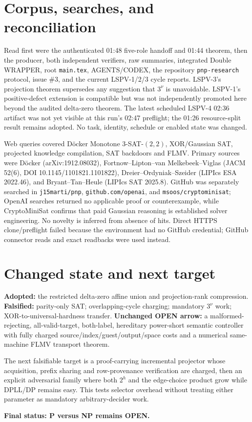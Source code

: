 \documentclass[11pt]{article}
\begin{document}
\section{Corpus, searches, and reconciliation}
Read first were the authenticated 01:48 five-role handoff and 01:44 theorem,
then the producer, both independent verifiers, raw summaries, integrated
Double WRAPPER, root \texttt{main.tex}, AGENTS/CODEX, the repository
\texttt{pnp-research} protocol, issue \#3, and the current LSPV-1/2/3 cycle
reports.  LSPV-3's projection theorem supersedes any suggestion that
$3^\nu$ is unavoidable.  LSPV-1's positive-defect extension is compatible but
was not independently promoted here beyond the audited delta-zero theorem.
The latest scheduled LSPV-4 02:36 artifact was not yet visible at this run's
02:47 preflight; the 01:26 resource-split result remains adopted.  No task,
identity, schedule or enabled state was changed.

Web queries covered D\"ocker Monotone 3-SAT-$(2,2)$, XOR/Gaussian SAT,
projected knowledge compilation, SAT backdoors and FLMV.  Primary sources
were D\"ocker (arXiv:1912.08032), Fortnow--Lipton--van Melkebeek--Viglas
(JACM 52(6), DOI 10.1145/1101821.1101822), Dreier--Ordyniak--Szeider
(LIPIcs ESA 2022.46), and Bryant--Tan--Heule (LIPIcs SAT 2025.8).
GitHub was separately searched in \texttt{j15marti/pnp},
\texttt{github.com/openai}, and \texttt{msoos/cryptominisat}; OpenAI searches
returned no applicable proof or counterexample, while CryptoMiniSat confirms
that paid Gaussian reasoning is established solver engineering.  No novelty
is inferred from absence of hits.  Direct HTTPS clone/preflight failed because
the environment had no GitHub credential; GitHub connector reads and exact
readbacks were used instead.

\section{Changed state and next target}
\textbf{Adopted:} the restricted delta-zero affine union and projection-rank
compression.  \textbf{Falsified:} parity-only SAT; overlapping-cycle charging;
mandatory $3^\nu$ work; XOR-to-universal-hardness transfer.
\textbf{Unchanged OPEN arrow:} a malformed-rejecting, all-valid-target,
both-label, hereditary power-short semantic controller with fully charged
source/index/guest/output/space costs and a numerical same-machine FLMV
transport theorem.

The next falsifiable target is a proof-carrying incremental projector whose
acquisition, prefix sharing and row-provenance verification are charged, then
an explicit adversarial family where both $2^h$ and the edge-choice product
grow while DPLL/DP remains easy.  This tests selector overhead without treating
either parameter as mandatory arbitrary-decider work.

\bigskip
\noindent\textbf{Final status: P versus NP remains OPEN.}
\end{document}
